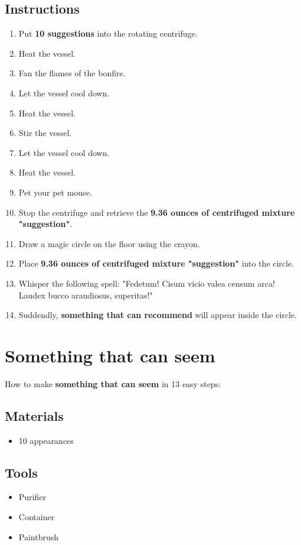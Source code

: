 \documentclass{article}
\begin{document}
\subsection{Instructions}\begin{enumerate}
\item 
Put \textbf{10 suggestions} into the rotating centrifuge.
\item 
Heat the vessel.
\item 
Fan the flames of the bonfire.
\item 
Let the vessel cool down.
\item 
Heat the vessel.
\item 
Stir the vessel.
\item 
Let the vessel cool down.
\item 
Heat the vessel.
\item 
Pet your pet mouse.
\item 
Stop the centrifuge and retrieve the \textbf{9.36 ounces of centrifuged mixture "suggestion"}.
\item 
Draw a magic circle on the floor using the crayon.
\item 
Place \textbf{9.36 ounces of centrifuged mixture "suggestion"} into the circle.
\item 
Whisper the following spell: "Fedetum! Cisum vicio valea censum arca! Laudex bucco araudiosus, superitas!"
\item 
Suddendly, \textbf{something that can recommend} will appear inside the circle.
\end{enumerate}
\newpage
\section{Something that can seem}How to make \textbf{something that can seem} in 13 easy steps:

\subsection{Materials}\begin{itemize}
\item 
10 appearances
\end{itemize}
\subsection{Tools}\begin{itemize}
\item 
Purifier
\item 
Container
\item 
Paintbrush
\end{itemize}
\end{document}
